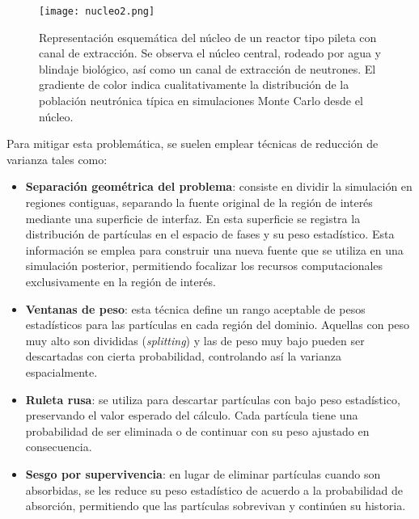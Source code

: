 \begin{figure}[H]
    \centering
    \texttt{[image: nucleo2.png]}
    \caption{Representación esquemática del núcleo de un reactor tipo pileta con canal de extracción. Se observa el núcleo central, rodeado por agua y blindaje biológico, así como un canal de extracción de neutrones. El gradiente de color indica cualitativamente la distribución de la población neutrónica típica en simulaciones Monte Carlo desde el núcleo.}
    \label{fig:nucleo2}
\end{figure}



Para mitigar esta problemática, se suelen emplear técnicas de reducción de varianza tales como:
\begin{itemize}

    \item \textbf{Separación geométrica del problema}: consiste en dividir la simulación en regiones contiguas, separando la fuente original de la región de interés mediante una superficie de interfaz. En esta superficie se registra la distribución de partículas en el espacio de fases y su peso estadístico. Esta información se emplea para construir una nueva fuente que se utiliza en una simulación posterior, permitiendo focalizar los recursos computacionales exclusivamente en la región de interés.
    
    \item \textbf{Ventanas de peso}: esta técnica define un rango aceptable de pesos estadísticos para las partículas en cada región del dominio. Aquellas con peso muy alto son divididas (\emph{splitting}) y las de peso muy bajo pueden ser descartadas con cierta probabilidad, controlando así la varianza espacialmente.
    
    \item \textbf{Ruleta rusa}: se utiliza para descartar partículas con bajo peso estadístico, preservando el valor esperado del cálculo. Cada partícula tiene una probabilidad de ser eliminada o de continuar con su peso ajustado en consecuencia.
    
    \item \textbf{Sesgo por supervivencia}: en lugar de eliminar partículas cuando son absorbidas, se les reduce su peso estadístico de acuerdo a la probabilidad de absorción, permitiendo que las partículas sobrevivan y continúen su historia.
\end{itemize}

